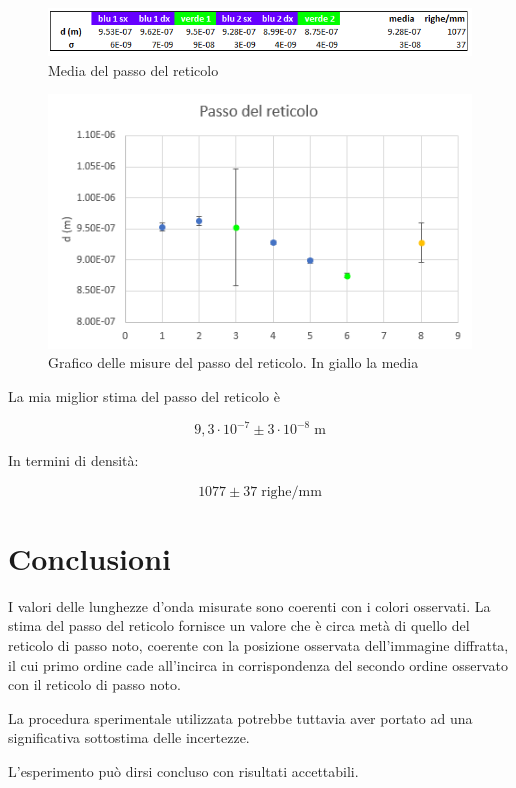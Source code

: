 \documentclass{article}
\begin{document}
\begin{figure}[h!]
  \centering
  \includegraphics[width=0.6\linewidth]{IM_d_megl}
  \caption{Media del passo del reticolo}
\end{figure}

\begin{figure}[h!]
  \centering
  \includegraphics[width=0.6\linewidth]{IM grafico_d_megl}
  \caption{Grafico delle misure del passo del reticolo. In giallo la media}
\end{figure}

La mia miglior stima del passo del reticolo è

\[9,3 \cdot 10^{-7} \pm 3 \cdot 10^{-8} \; \textrm{m}\]

In termini di densità:

\[1077 \pm 37 \; \textrm{righe}/\textrm{mm}\]

\section{Conclusioni}

I valori delle lunghezze d'onda misurate sono coerenti con i colori osservati. La stima del passo del reticolo fornisce un valore che è circa metà di quello del reticolo di passo noto, coerente con la posizione osservata dell'immagine diffratta, il cui primo ordine cade all'incirca in corrispondenza del secondo ordine osservato con il reticolo di passo noto. 

La procedura sperimentale utilizzata potrebbe tuttavia aver portato ad una significativa sottostima delle incertezze.

\vspace{5mm}

L'esperimento può dirsi concluso con risultati accettabili.
\end{document}
